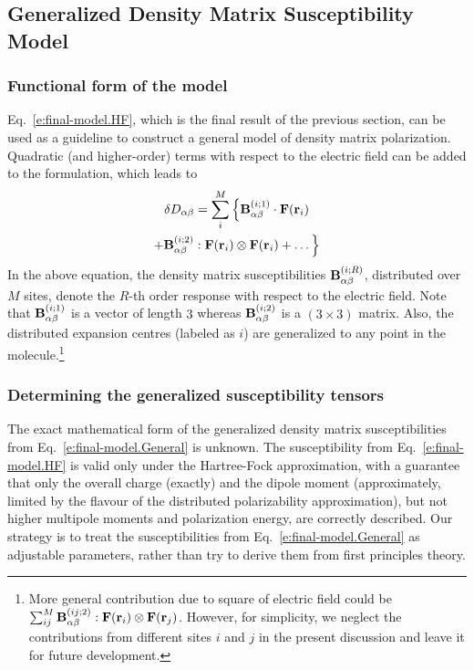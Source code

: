 \documentclass[aip,amsmath,amssymb,reprint,floatfix]{revtex4-1}
\begin{document}
\subsection{Generalized Density Matrix Susceptibility Model}

\subsubsection{Functional form of the model}

Eq.~\eqref{e:final-model.HF}, which is the final result of the previous section, 
can be used as a guideline to construct a general model of density matrix polarization.
Quadratic (and higher\hyp{}order) terms with respect to the electric field
can be added to the formulation, which leads to
%
\begin{multline}\label{e:final-model.General}
 \delta D_{\alpha\beta} = \sum_{i }^M \Big\{
                                      {\bf B}^{(i ; 1)}_{\alpha\beta} \cdot {\bf F}({\bf r}_i)  \\
                        +             {\bf B}^{(i ; 2)}_{\alpha\beta} : {\bf F}({\bf r}_i) \otimes {\bf F}({\bf r}_i) 
                        + \ldots \Big\}
\end{multline}
%
In the above equation, the density matrix susceptibilities
${\bf B}^{(i; R)}_{\alpha\beta}$, distributed over $M$ sites,
denote the $R$-th order response with respect to the electric field.
Note that
${\bf B}^{(i; 1)}_{\alpha\beta}$ is a vector of length $3$ whereas ${\bf B}^{(i; 2)}_{\alpha\beta}$
is a $(3\times 3)$ matrix. Also, the distributed expansion centres
(labeled as $i$) are generalized to any point in the molecule.\footnote{More general
contribution due to square of electric field could 
be $\sum_{ij}^M {\bf B}^{(ij; 2)}_{\alpha\beta} : {\bf F}({\bf r}_i) \otimes {\bf F}({\bf r}_j)$. 
However, for simplicity, we neglect the contributions from different sites $i$ and $j$
in the present discussion and leave it for future development.
}

\subsubsection{Determining the generalized susceptibility tensors}

The exact mathematical form of the generalized density matrix susceptibilities 
from Eq.~\eqref{e:final-model.General} is unknown. 
The susceptibility from Eq.~\eqref{e:final-model.HF} is valid only under the Hartree\hyp{}Fock
approximation, with a guarantee that only the overall charge (exactly) and the dipole moment (approximately,
limited by the flavour of the distributed polarizability approximation), 
but not higher multipole moments and polarization energy, are correctly described.
Our strategy is to treat the susceptibilities from Eq.~\eqref{e:final-model.General}
as adjustable parameters, rather than try to derive them from first principles theory.
\end{document}
